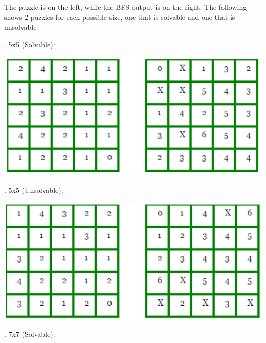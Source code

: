 \documentclass[12pt, letterpaper]{article}
\begin{document}
\quad The puzzle is on the left, while the BFS output is on the right. The following shows 2 puzzles for each possible size, one that is solvable and one that is unsolvable

\medskip
{}. 5x5 (Solvable):
	
\includegraphics[width=\linewidth]{"Task 2/5x5 Puzzle (Solvable)"}

\bigskip
{}. 5x5 (Unsolvable):

\includegraphics[width=\linewidth]{"Task 2/5x5 Puzzle (Unsolvable)"}

\bigskip
{}. 7x7 (Solvable):
\end{document}
